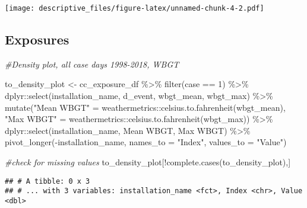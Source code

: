 \documentclass[
]{article}
\newenvironment{Shaded}{\begin{snugshade}}{\end{snugshade}}
\newcommand{\AttributeTok}[1]{\textcolor[rgb]{0.77,0.63,0.00}{#1}}
\newcommand{\CommentTok}[1]{\textcolor[rgb]{0.56,0.35,0.01}{\textit{#1}}}
\newcommand{\DecValTok}[1]{\textcolor[rgb]{0.00,0.00,0.81}{#1}}
\newcommand{\FunctionTok}[1]{\textcolor[rgb]{0.00,0.00,0.00}{#1}}
\newcommand{\NormalTok}[1]{#1}
\newcommand{\OtherTok}[1]{\textcolor[rgb]{0.56,0.35,0.01}{#1}}
\newcommand{\SpecialCharTok}[1]{\textcolor[rgb]{0.00,0.00,0.00}{#1}}
\newcommand{\StringTok}[1]{\textcolor[rgb]{0.31,0.60,0.02}{#1}}
\begin{document}
\texttt{[image: descriptive\_files/figure-latex/unnamed-chunk-4-2.pdf]}

\hypertarget{exposures}{%
\subsection{Exposures}\label{exposures}}

\begin{Shaded}
\begin{Highlighting}[]
\CommentTok{\#Density plot, all case days 1998{-}2018, WBGT}


\NormalTok{to\_density\_plot }\OtherTok{\textless{}{-}}
\NormalTok{  cc\_exposure\_df }\SpecialCharTok{\%\textgreater{}\%}
    \FunctionTok{filter}\NormalTok{(case }\SpecialCharTok{==} \DecValTok{1}\NormalTok{) }\SpecialCharTok{\%\textgreater{}\%} 
\NormalTok{    dplyr}\SpecialCharTok{::}\FunctionTok{select}\NormalTok{(installation\_name, d\_event, wbgt\_mean, wbgt\_max) }\SpecialCharTok{\%\textgreater{}\%} 
    \FunctionTok{mutate}\NormalTok{(}\StringTok{"Mean WBGT"} \OtherTok{=}\NormalTok{ weathermetrics}\SpecialCharTok{::}\FunctionTok{celsius.to.fahrenheit}\NormalTok{(wbgt\_mean),}
           \StringTok{"Max WBGT"} \OtherTok{=}\NormalTok{ weathermetrics}\SpecialCharTok{::}\FunctionTok{celsius.to.fahrenheit}\NormalTok{(wbgt\_max)) }\SpecialCharTok{\%\textgreater{}\%} 
\NormalTok{    dplyr}\SpecialCharTok{::}\FunctionTok{select}\NormalTok{(installation\_name, }\StringTok{\textasciigrave{}}\AttributeTok{Mean WBGT}\StringTok{\textasciigrave{}}\NormalTok{, }\StringTok{\textasciigrave{}}\AttributeTok{Max WBGT}\StringTok{\textasciigrave{}}\NormalTok{) }\SpecialCharTok{\%\textgreater{}\%} 
    \FunctionTok{pivot\_longer}\NormalTok{(}\SpecialCharTok{{-}}\NormalTok{installation\_name, }\AttributeTok{names\_to =} \StringTok{"Index"}\NormalTok{, }\AttributeTok{values\_to =} \StringTok{"Value"}\NormalTok{)}

  
\CommentTok{\#check for missing values}
\NormalTok{  to\_density\_plot[}\SpecialCharTok{!}\FunctionTok{complete.cases}\NormalTok{(to\_density\_plot),]}
\end{Highlighting}
\end{Shaded}

\begin{verbatim}
## # A tibble: 0 x 3
## # ... with 3 variables: installation_name <fct>, Index <chr>, Value <dbl>
\end{verbatim}
\end{document}
